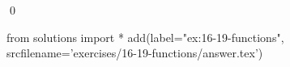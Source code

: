 
\begin{ex}
  \label{ex:16-19-functions}
  
  \qed
\end{ex}
\begin{python0}
from solutions import *
add(label="ex:16-19-functions",
    srcfilename='exercises/16-19-functions/answer.tex')
\end{python0}
